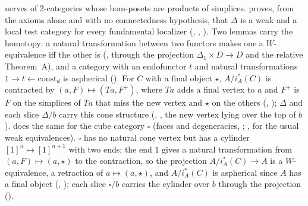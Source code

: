 nerves of 2-categories whose hom-posets are products of simplices.  proves, from the axioms alone and with no connectedness hypothesis, that $\Delta$ is a weak and a local test category for every fundamental localizer (, , ). Two lemmas carry the homotopy: a natural transformation between two functors makes one a $W$-equivalence iff the other is (, through the projection $\Delta_1\times D\to D$ and the relative Theorem~A), and a category with an endofunctor $t$ and natural transformations $1\to t\leftarrow\mathrm{const}_d$ is aspherical (). For $C$ with a final object $\star$, $A/i_A^*(C)$ is contracted by $(a,F)\mapsto(Ta,F^+)$, where $Ta$ adds a final vertex to $a$ and $F^+$ is $F$ on the simplices of $Ta$ that miss the new vertex and $\star$ on the others (, ); $\Delta$ and each slice $\Delta/b$ carry this cone structure (, , the new vertex lying over the top of $b$).  does the same for the cube category $\square$ (faces and degeneracies, ; , \cite[Cor.~8.4.13]{cisinski-308} for the usual weak equivalences). $\square$ has no natural cone vertex but has a cylinder $[1]^n\mapsto[1]^{n+1}$ with two ends; the end $1$ gives a natural transformation from $(a,F)\mapsto(a,\star)$ to the contraction, so the projection $A/i_A^*(C)\to A$ is a $W$-equivalence, a retraction of $a\mapsto(a,\star)$, and $A/i_A^*(C)$ is aspherical since $A$ has a final object (, ); each slice $\square/b$ carries the cylinder over $b$ through the projection ().
